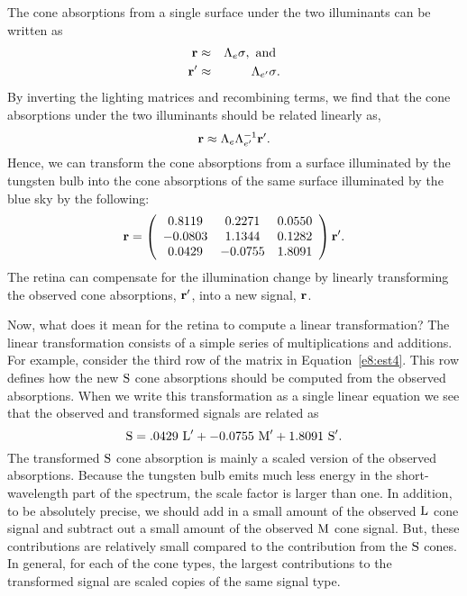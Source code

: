 The cone absorptions from a single surface under the two illuminants
can be written as
\begin{eqnarray}
\mbox{$\bf r$} & \approx & \mbox{$\Lambda_{e}$} \mbox{${\bf \sigma}$}, \mbox{ and } \nonumber \\
\mbox{$\bf r$}^\prime & \approx &  \mbox{$\Lambda_{e'}$} \mbox{${\bf \sigma}$} \nonumber .
\end{eqnarray}
By inverting the lighting matrices and recombining terms, we find that
the cone absorptions under the two illuminants should be related
linearly as,
\begin{equation}
\label{e8:est3}
\mbox{$\bf r$} \approx \mbox{$\Lambda_{e}$} \mbox{$\Lambda^{-1}_{e'}$} \mbox{$\bf r$}^\prime .
\end{equation}
Hence, we can transform the cone absorptions from a surface illuminated by
the tungsten bulb into the cone absorptions of the same surface
illuminated by the blue sky by the following:
\begin{equation}
\label{e8:est4}
\mbox{$\bf r$}  = 
\left (
 \begin{array}{ccc}
    0.8119 &   0.2271  &  0.0550 \\
   -0.0803 &   1.1344  &  0.1282 \\
    0.0429 &  -0.0755  &  1.8091 \\
 \end{array}
\right ) \mbox{$\bf r$}^\prime.
\end{equation}
The retina can compensate for the illumination change by linearly
transforming the observed cone absorptions, $\mbox{$\bf r$}^\prime$, into a
new signal, $\mbox{$\bf r$}$.

Now, what does it mean for the retina to compute a linear
transformation?  
The linear transformation consists of a simple series of
multiplications and additions.
For example, consider the third row of the matrix in
Equation~\ref{e8:est4}.  
This row defines how the new $\mbox{S}$ cone absorptions should be
computed from the observed absorptions.
When we write this transformation as a single linear equation we
see that the observed and transformed signals are related as
\begin{equation}
\mbox{S} = .0429~\mbox{L}^\prime + -0.0755~\mbox{M}^\prime + 1.8091~\mbox{S}^\prime .
\end{equation}
The transformed $\mbox{S}$ cone absorption is mainly a scaled version of
the observed absorptions.  Because the tungsten bulb emits much
less energy in the short-wavelength part of the spectrum, the scale
factor is larger than one.  In addition, to be absolutely precise, we
should add in a small amount of the observed $\mbox{L}$ cone signal and
subtract out a small amount of the observed $\mbox{M}$ cone signal.
But, these contributions are relatively small compared to the
contribution from the $\mbox{S}$ cones.  In general, for each of the cone
types, the largest contributions to the transformed signal are scaled
copies of the same signal type.

